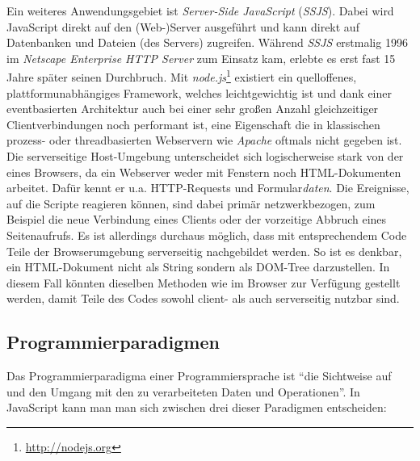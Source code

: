 Ein weiteres Anwendungsgebiet ist \emph{Server-Side JavaScript} (\emph{SSJS}). Dabei wird JavaScript
direkt auf den (Web-)Server ausgeführt und kann direkt auf Datenbanken und Dateien
(des Servers) zugreifen. Während \emph{SSJS} erstmalig 1996 im \emph{Netscape Enterprise HTTP Server}
zum Einsatz kam, erlebte es erst fast 15 Jahre später seinen Durchbruch. Mit
\emph{node.js}\footnote{\href{http://nodejs.org}{http://nodejs.org}} existiert ein quelloffenes,
plattformunabhängiges Framework, welches leichtgewichtig ist und dank einer eventbasierten Architektur
auch bei einer sehr großen Anzahl gleichzeitiger Clientverbindungen noch performant ist, eine
Eigenschaft die in klassischen prozess- oder threadbasierten Webservern wie \emph{Apache} oftmals
nicht gegeben ist. Die serverseitige Host-Umgebung unterscheidet sich logischerweise stark von der
eines Browsers, da ein Webserver weder mit Fenstern noch HTML-Dokumenten arbeitet. Dafür kennt er
u.a. HTTP-Requests und Formular\emph{daten}. Die Ereignisse, auf die Scripte reagieren
können, sind dabei primär netzwerkbezogen, zum Beispiel die neue Verbindung eines Clients oder
der vorzeitige Abbruch eines Seitenaufrufs. Es ist allerdings durchaus möglich, dass mit
entsprechendem Code Teile der Browserumgebung serverseitig nachgebildet werden. So ist es denkbar,
ein HTML-Dokument nicht als String sondern als DOM-Tree darzustellen. In diesem Fall könnten
dieselben Methoden wie im Browser zur Verfügung gestellt werden, damit Teile des Codes sowohl
client- als auch serverseitig nutzbar sind.


\subsection{Programmierparadigmen}

Das Programmierparadigma einer Programmiersprache ist \enquote{die Sichtweise auf und den Umgang mit
den zu verarbeiteten Daten und Operationen}. \citep[Kap. 1.3.1]{progsprachen} In JavaScript kann man
man sich zwischen drei dieser Paradigmen entscheiden:

